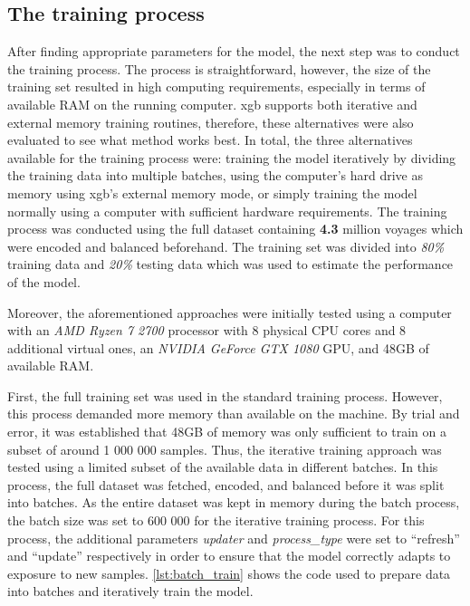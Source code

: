 \subsection{The training process}
\label{sec:training_process}

After finding appropriate parameters for the model, the next step was to conduct the training process. The process is straightforward, however, the size of the training set resulted in high computing requirements, especially in terms of available RAM on the running computer. \acrshort{xgb} supports both iterative and external memory training routines, therefore, these alternatives were also evaluated to see what method works best. In total, the three alternatives available for the training process were: training the model iteratively by dividing the training data into multiple batches, using the computer's hard drive as memory using \acrshort{xgb}'s external memory mode, or simply training the model normally using a computer with sufficient hardware requirements. The training process was conducted using the full dataset containing \textbf{4.3} million voyages which were encoded and balanced beforehand. The training set was divided into \textit{80\%} training data and \textit{20\%} testing data which was used to estimate the performance of the model.

Moreover, the aforementioned approaches were initially tested using a computer with an \textit{AMD Ryzen 7 2700} processor with 8 physical CPU cores and 8 additional virtual ones, an \textit{NVIDIA GeForce GTX 1080} GPU, and 48GB of available RAM\@.

First, the full training set was used in the standard training process. However, this process demanded more memory than available on the machine. By trial and error, it was established that 48GB of memory was only sufficient to train on a subset of around 1 000 000 samples. Thus, the iterative training approach was tested using a limited subset of the available data in different batches. In this process, the full dataset was fetched, encoded, and balanced before it was split into batches. As the entire dataset was kept in memory during the batch process, the batch size was set to 600 000 for the iterative training process. For this process, the additional parameters \textit{updater} and \textit{process\_type} were set to ``refresh'' and ``update'' respectively in order to ensure that the model correctly adapts to exposure to new samples. \cref{lst:batch_train} shows the code used to prepare data into batches and iteratively train the model.

